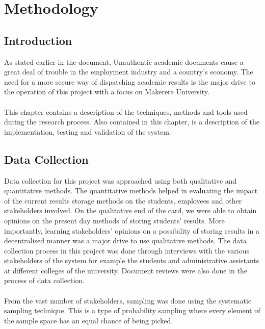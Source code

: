 \chapter{Methodology}

\section{Introduction}
As stated earlier in the document, Unauthentic academic documents cause a great deal of trouble in the employment industry and a country's economy. The need for a more secure way of dispatching academic results is the major drive to the operation of this project with a focus on Makerere University. \\~\\
This chapter contains a description of the techniques, methods and tools used during the research process. Also contained in this chapter, is a description of the implementation, testing and validation of the system. 

\section{Data Collection}
Data collection for this project was approached using both qualitative and quantitative methods. The quantitative methods helped in evaluating the impact of the current results storage methods on the students, employees and other stakeholders involved. On the qualitative end of the card, we were able to obtain opinions on the present day methods of storing students' results. More importantly, learning stakeholders' opinions on a possibility of storing results in a decentralised manner was a major drive to use qualitative methods.
The data collection process in this project was done through interviews with the various stakeholders of the system for example the students and administrative assistants at different colleges of the university. Document reviews were also done in the process of data collection.\\~\\
From the vast number of stakeholders, sampling was done using the systematic sampling technique. This is a type of probability sampling where every element of the sample space has an equal chance of being picked. 

